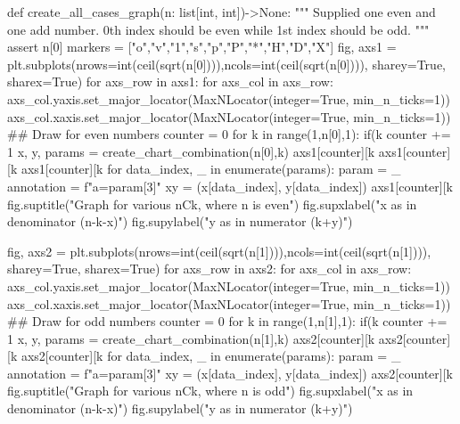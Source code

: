 \documentclass[12pt, twoside]{article}
\begin{document}
\begin{appendices}
\begin{python}
{def create_all_cases_graph(n: list[int, int])->None:
    """
    Supplied one even and one add number. 0th index should be even while 1st index should be odd.
    """
    assert n[0]%
    markers = ["o","v","1","s","p","P","*","H","D","X"]
    fig, axs1 = plt.subplots(nrows=int(ceil(sqrt(n[0]))),ncols=int(ceil(sqrt(n[0]))), sharey=True, sharex=True)
    for axs_row in axs1:
        for axs_col in axs_row:
            axs_col.yaxis.set_major_locator(MaxNLocator(integer=True, min_n_ticks=1))
            axs_col.xaxis.set_major_locator(MaxNLocator(integer=True, min_n_ticks=1))
    ## Draw for even numbers
    counter = 0
    for k in range(1,n[0],1):
        if(k%
            counter += 1        
        x, y, params = create_chart_combination(n[0],k)
        axs1[counter][k%
        axs1[counter][k%
        axs1[counter][k%
        for data_index, _ in enumerate(params):
            param = _
            annotation = f"a={param[3]}"
            xy = (x[data_index], y[data_index])
            axs1[counter][k%
    fig.suptitle("Graph for various nCk, where n is even")
    fig.supxlabel("x as in denominator (n-k-x)")
    fig.supylabel("y as in numerator (k+y)")
    
    fig, axs2 = plt.subplots(nrows=int(ceil(sqrt(n[1]))),ncols=int(ceil(sqrt(n[1]))), sharey=True, sharex=True)
    for axs_row in axs2:
        for axs_col in axs_row:
            axs_col.yaxis.set_major_locator(MaxNLocator(integer=True, min_n_ticks=1))
            axs_col.xaxis.set_major_locator(MaxNLocator(integer=True, min_n_ticks=1))    
    ## Draw for odd numbers
    counter = 0
    for k in range(1,n[1],1):
        if(k%
            counter += 1        
        x, y, params = create_chart_combination(n[1],k)
        axs2[counter][k%
        axs2[counter][k%
        axs2[counter][k%
        for data_index, _ in enumerate(params):
            param = _
            annotation = f"a={param[3]}"
            xy = (x[data_index], y[data_index]) 
            axs2[counter][k%
    fig.suptitle("Graph for various nCk, where n is odd")
    fig.supxlabel("x as in denominator (n-k-x)")
    fig.supylabel("y as in numerator (k+y)")

}
\end{python}
\end{appendices}
\end{document}
